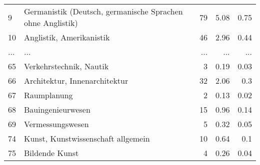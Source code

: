 \begin{longtable}{lXrrr}
        9 & \multicolumn{1}{X}{Germanistik (Deutsch, germanische Sprachen ohne Anglistik)} & %
          \num{79} &
          \num[round-mode=places,round-precision=2]{5,08} &
          \num[round-mode=places,round-precision=2]{0,75} \\
        10 & \multicolumn{1}{X}{Anglistik, Amerikanistik} & %
          \num{46} &
          \num[round-mode=places,round-precision=2]{2,96} &
          \num[round-mode=places,round-precision=2]{0,44} \\
       ... & ... & ... & ... & ... \\
        65 & \multicolumn{1}{X}{Verkehrstechnik, Nautik} & %
          \num{3} &
          \num[round-mode=places,round-precision=2]{0,19} &
          \num[round-mode=places,round-precision=2]{0,03} \\

        66 & \multicolumn{1}{X}{Architektur, Innenarchitektur} & %
          \num{32} &
          \num[round-mode=places,round-precision=2]{2,06} &
          \num[round-mode=places,round-precision=2]{0,3} \\

        67 & \multicolumn{1}{X}{Raumplanung} & %
          \num{2} &
          \num[round-mode=places,round-precision=2]{0,13} &
          \num[round-mode=places,round-precision=2]{0,02} \\

        68 & \multicolumn{1}{X}{Bauingenieurwesen} & %
          \num{15} &
          \num[round-mode=places,round-precision=2]{0,96} &
          \num[round-mode=places,round-precision=2]{0,14} \\

        69 & \multicolumn{1}{X}{Vermessungswesen} & %
          \num{5} &
          \num[round-mode=places,round-precision=2]{0,32} &
          \num[round-mode=places,round-precision=2]{0,05} \\

        74 & \multicolumn{1}{X}{Kunst, Kunstwissenschaft allgemein} & %
          \num{10} &
          \num[round-mode=places,round-precision=2]{0,64} &
          \num[round-mode=places,round-precision=2]{0,1} \\

        75 & \multicolumn{1}{X}{Bildende Kunst} & %
          \num{4} &
          \num[round-mode=places,round-precision=2]{0,26} &
          \num[round-mode=places,round-precision=2]{0,04} \\


\end{longtable}

